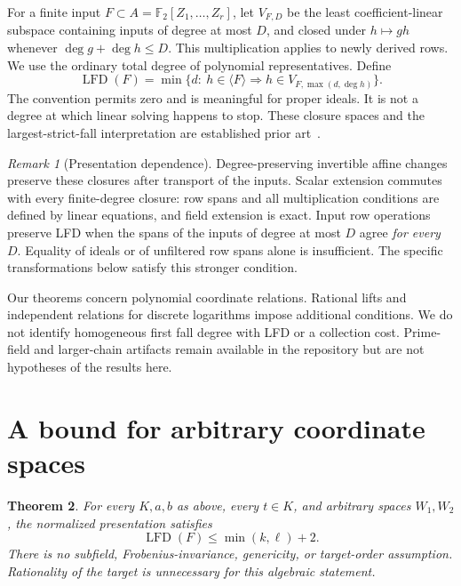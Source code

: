 \documentclass[11pt]{article}
\newtheorem{theorem}{Theorem}
\theoremstyle{remark}\newtheorem{remark}[theorem]{Remark}
\newcommand{\F}{\mathbb F}
\newcommand{\lfd}{\operatorname{LFD}}
\newcommand{\Id}{\langle F\rangle}
\begin{document}
For a finite input $F\subset A=\F_2[Z_1,\ldots,Z_r]$, let $V_{F,D}$ be
the least coefficient-linear subspace containing inputs of degree at most
$D$, and closed under $h\mapsto gh$ whenever
$\deg g+\deg h\le D$. This multiplication applies to newly derived rows.
We use the ordinary total degree of polynomial representatives. Define
\[
 \lfd(F)=\min\{d:\ h\in\Id\Longrightarrow
                  h\in V_{F,\max(d,\deg h)}\}.
\]
The convention permits zero and is meaningful for proper ideals. It is
not a degree at which linear solving happens to stop. These closure spaces
and the largest-strict-fall interpretation are established prior
art~\cite{hkyy,cg}.

\begin{remark}[Presentation dependence]\label{rem:transport}
Degree-preserving invertible affine changes preserve these closures after
transport of the inputs. Scalar extension commutes with every finite-degree
closure: row spans and all multiplication conditions are defined by linear
equations, and field extension is exact. Input row operations preserve LFD
when the spans of the inputs of degree at most $D$ agree \emph{for every}
$D$. Equality of ideals or of unfiltered row spans alone is insufficient.
The specific transformations below satisfy this stronger condition.
\end{remark}

Our theorems concern polynomial coordinate relations. Rational lifts and
independent relations for discrete logarithms impose additional conditions.
We do not identify homogeneous first fall degree with LFD or a collection
cost. Prime-field and larger-chain artifacts remain available in the
repository but are not hypotheses of the results here.

\section{A bound for arbitrary coordinate spaces}
\begin{theorem}\label{thm:uniform}
For every $K,a,b$ as above, every $t\in K$, and arbitrary spaces $W_1,W_2$,
the normalized presentation satisfies
\[
                \lfd(F)\le\min(k,\ell)+2.
\]
There is no subfield, Frobenius-invariance, genericity, or target-order
assumption. Rationality of the target is unnecessary for this algebraic
statement.
\end{theorem}
\end{document}
